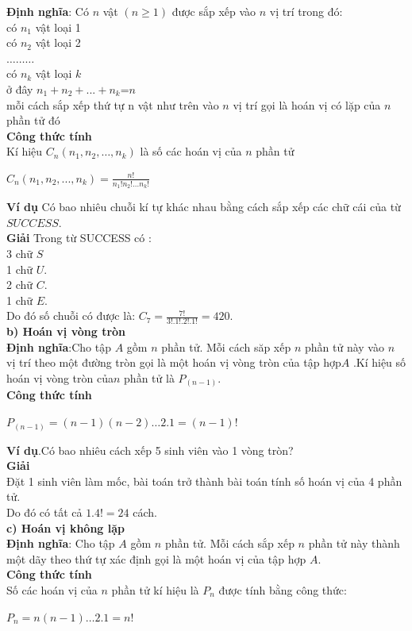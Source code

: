 \documentclass[12pt,oneside,a4paper,reqno]{book}
\begin{document}
{\bf Định nghĩa}: Có $n$ vật $(n \ge 1)$ được sắp xếp vào $n$ vị trí trong đó:\\
      có $n_1$  vật loại 1\\
      có $n_2$  vật loại 2\\
      $…   …   …$\\
      có $n_k$  vật loại $k$\\
ở đây $n_1+n_2+...+n_k$=$n$\\
mỗi cách sắp xếp thứ tự n vật như trên vào $n$ vị trí gọi là hoán vị có lặp của $n$ phần tử đó\\
{\bf Công thức tính}\\
Kí hiệu $C_n (n_1,n_2,…,n_k)$ là số các hoán vị của $n$ phần tử\\
\begin{center}
$C_{n}(n_1,n_2,...,n_k)=\frac{n! }{n_1!  n_2! ...n_k! }$
\end{center}
{\bf Ví dụ}
Có bao nhiêu chuỗi kí tự khác nhau bằng cách sắp xếp các chữ cái của từ $SUCCESS.$\\
{\bf Giải}
Trong từ SUCCESS có :\\ 
                                       3 chữ $S$\\
                                       1 chữ $U$.\\
                                       2 chữ $C$.\\
                                       1 chữ $E$.\\
Do đó số chuỗi có được là: $C_7= \frac{7!}{3!.1!.2!.1!}=420.$\\
{\bf b) Hoán vị vòng tròn}\\
{\bf Định nghĩa}:Cho tập $A$ gồm $n$ phần tử. Mỗi cách săp xếp $n$ phần tử này vào $n$ vị trí theo một đường tròn gọi là một hoán vị vòng tròn của tập hợp$A$ .Kí hiệu số hoán vị vòng tròn của$n$ phần tử là $P_(n-1)$.\\
{\bf Công thức tính}\\
\begin{center}
$P_(n-1)=(n-1)(n-2)…2.1=(n-1)!$
\end{center}
{\bf Ví dụ}.Có bao nhiêu cách xếp 5 sinh viên vào 1 vòng tròn?\\
{\bf Giải}\\
Đặt 1 sinh viên làm mốc, bài toán trở thành bài toán tính số hoán vị của 4 phần tử.\\
Do đó có tất cả $1.4!=24$ cách.\\
{\bf c) Hoán vị không lặp}\\
{\bf Định nghĩa}: Cho tập $A$ gồm $n$ phần tử. Mỗi cách sắp xếp $n$ phần tử này thành một dãy theo thứ tự xác định gọi là một hoán vị của tập hợp $A$.\\
{\bf Công thức tính}\\
Số các hoán vị của $n$ phần tử kí hiệu là $P_n$  được tính bằng công thức:\\
 \begin{center}
$P_n=n(n-1)…2.1=n!$
\end{center}
\end{document}
